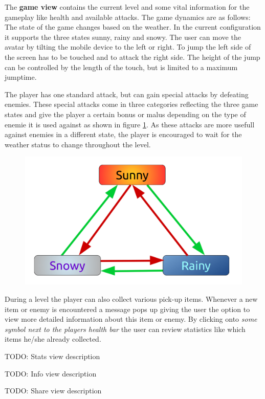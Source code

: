 \documentclass{sigchi}
\begin{document}
The \textbf{game view} contains the current level and some vital information for the gameplay like health and available attacks. The game dynamics are as follows: The state of the game changes based on the weather. In the current configuration it supports the three states sunny, rainy and snowy. The user can move the avatar by tilting the mobile device to the left or right. To jump the left side of the screen has to be touched and to attack the right side. The height of the jump can be controlled by the length of the touch, but is limited to a maximum jumptime.

The player has one standard attack, but can gain special attacks by defeating enemies. These special attacks come in three categories reflecting the three game states and give the player a certain bonus or malus depending on the type of enemie it is used against as shown in figure \ref{fig:attacks}. As these attacks are more usefull against enemies in a different state, the player is encouraged to wait for the weather status to change throughout the level.

\begin{figure}
\label{fig:attacks}
	\centering
	\includegraphics[width=0.9\columnwidth]{figures/attacks.png}
\end{figure}

During a level the player can also collect various pick-up items. Whenever a new item or enemy is encountered a message pops up giving the user the option to view more detailed information about this item or enemy. By clicking onto \textit{some symbol next to the players health bar} the user can review statistics like which items he/she already collected.

TODO: Stats view description

TODO: Info view description

TODO: Share view description
\end{document}
